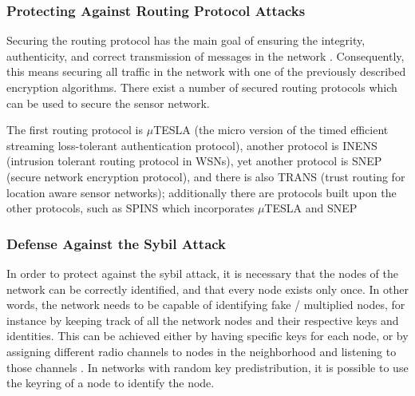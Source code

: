 \documentclass[12pt,a4paper,twoside]{report}
\begin{document}
\subsubsection{Protecting Against Routing Protocol Attacks}
Securing the routing protocol has the main goal of ensuring the integrity, authenticity, and correct transmission of messages in the network \cite{sen:2009}. Consequently, this means securing all traffic in the network with one of the previously described encryption algorithms. There exist a number of secured routing protocols which can be used to secure the sensor network. \par
The first routing protocol is $\mu$TESLA (the micro version of the timed efficient streaming loss-tolerant authentication protocol), another protocol is INENS (intrusion tolerant routing protocol in WSNs), yet another protocol is SNEP (secure network encryption protocol), and there is also TRANS (trust routing for location aware sensor networks); additionally there are protocols built upon the other protocols, such as SPINS which incorporates $\mu$TESLA and SNEP \cite{sen:2009}\par
\subsubsection{Defense Against the Sybil Attack}
In order to protect against the sybil attack, it is necessary that the nodes of the network can be correctly identified, and that every node exists only once. In other words, the network needs to be capable of identifying fake / multiplied nodes, for instance by keeping track of all the network nodes and their respective keys and identities. This can be achieved either by having specific keys for each node, or by assigning different radio channels to nodes in the neighborhood and listening to those channels \cite{sen:2009}. In networks with random key predistribution, it is possible to use the keyring of a node to identify the node.\par
\end{document}

